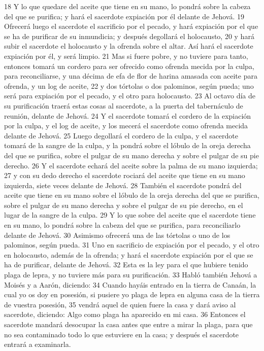 18 Y lo que quedare del aceite que tiene en su mano, lo pondrá sobre la cabeza del que se purifica; y hará el sacerdote expiación por él delante de Jehová.
19 Ofrecerá luego el sacerdote el sacrificio por el pecado, y hará expiación por el que se ha de purificar de su inmundicia; y después degollará el holocausto,
20 y hará subir el sacerdote el holocausto y la ofrenda sobre el altar. Así hará el sacerdote expiación por él, y será limpio.
21 Mas si fuere pobre, y no tuviere para tanto, entonces tomará un cordero para ser ofrecido como ofrenda mecida por la culpa, para reconciliarse, y una décima de efa   de flor de harina amasada con aceite para ofrenda, y un log de aceite,
22 y dos tórtolas o dos palominos, según pueda; uno será para expiación por el pecado, y el otro para holocausto.
23 Al octavo día de su purificación traerá estas cosas al sacerdote, a la puerta del tabernáculo de reunión, delante de Jehová.
24 Y el sacerdote tomará el cordero de la expiación por la culpa, y el log   de aceite, y los mecerá el sacerdote como ofrenda mecida delante de Jehová.
25 Luego degollará el cordero de la culpa, y el sacerdote tomará de la sangre de la culpa, y la pondrá sobre el lóbulo de la oreja derecha del que se purifica, sobre el pulgar de su mano derecha y sobre el pulgar de su pie derecho.
26 Y el sacerdote echará del aceite sobre la palma de su mano izquierda;
27 y con su dedo derecho el sacerdote rociará del aceite que tiene en su mano izquierda, siete veces delante de Jehová.
28 También el sacerdote pondrá del aceite que tiene en su mano sobre el lóbulo de la oreja derecha del que se purifica, sobre el pulgar de su mano derecha y sobre el pulgar de su pie derecho, en el lugar de la sangre de la culpa.
29 Y lo que sobre del aceite que el sacerdote tiene en su mano, lo pondrá sobre la cabeza del que se purifica, para reconciliarlo delante de Jehová.
30 Asimismo ofrecerá una de las tórtolas o uno de los palominos, según pueda.
31 Uno en sacrificio de expiación por el pecado, y el otro en holocausto, además de la ofrenda; y hará el sacerdote expiación por el que se ha de purificar, delante de Jehová.
32 Esta es la ley para el que hubiere tenido plaga de lepra, y no tuviere más para su purificación.
33 Habló también Jehová a Moisés y a Aarón, diciendo:
34 Cuando hayáis entrado en la tierra de Canaán, la cual yo os doy en posesión, si pusiere yo plaga de lepra en alguna casa de la tierra de vuestra posesión,
35 vendrá aquel de quien fuere la casa y dará aviso al sacerdote, diciendo: Algo como plaga ha aparecido en mi casa.
36 Entonces el sacerdote mandará desocupar la casa antes que entre a mirar la plaga, para que no sea contaminado todo lo que estuviere en la casa; y después el sacerdote entrará a examinarla.
